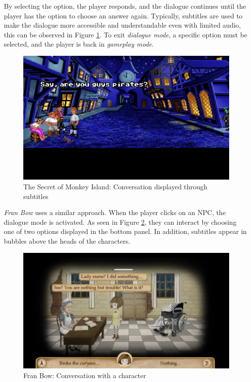 By selecting the option, the player responds, and the dialogue continues until the player has the option to choose an answer again. Typically, subtitles are used to make the dialogue more accessible and understandable even with limited audio, this can be observed in Figure \ref{fig:D-TSoMI2}. To exit \textit{dialogue mode}, a specific option must be selected, and the player is back in \textit{gameplay mode}.

\begin{figure}[H]
\centering
\includegraphics[width=.8\linewidth]{img/D-TSoMI2.png}
\caption{The Secret of Monkey Island: Conversation displayed through subtitles}
\label{fig:D-TSoMI2}
\end{figure}

\textit{Fran Bow} uses a similar approach. When the player clicks on an NPC, the dialogue mode is activated. As seen in Figure \ref{fig:D-FranBow}, they can interact by choosing one of two options displayed in the bottom panel. In addition, subtitles appear in bubbles above the heads of the characters. 

\begin{figure}[H]
\centering
\includegraphics[width=.8\linewidth]{img/D-FB.png}
\caption{Fran Bow: Conversation with a character}
\label{fig:D-FranBow}
\end{figure}

